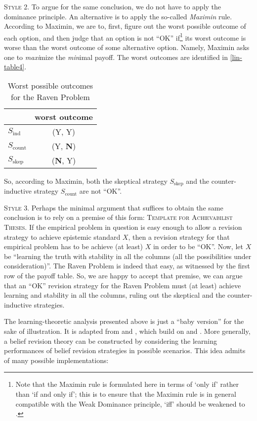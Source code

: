 \textsc{Style 2.} To argue for the same conclusion, we do not have to apply the dominance principle. An alternative is to apply the so-called {\em Maximin} rule. According to Maximin, we are to, first, figure out the worst possible outcome of each option, and then judge that an option is not ``OK'' if\footnote
	{Note that the Maximin rule is formulated here in terms of `only if' rather than `if and only if'; this is to ensure that the Maximin rule is in general compatible with the Weak Dominance principle, `iff' should be weakened to .} 
its worst outcome is worse than the worst outcome of some alternative option. Namely, Maximin asks one to {\em maxi}mize the {\em min}imal payoff. The worst outcomes are identified in \autoref{lin-table4}.
\begin{table}[ht]
\centering
\begin{tabular}{lc}
	& worst outcome
\\ \hline\hline
  	$S_{\textrm{ind}}$ & (Y, Y) \\
  	$S_{\textrm{count}}$ & (Y, \textbf{N}) \\
  	$S_{\textrm{skep}}$ & (\textbf{N}, Y)
\end{tabular}
\caption{Worst possible outcomes for the Raven Problem}\label{lin-table4}
\end{table}
So, according to Maximin, both the skeptical strategy $S_{\textrm{skep}}$ and the counter-inductive strategy $S_{\textrm{count}}$ are not ``OK''. 

\textsc{Style 3.} Perhaps the minimal argument that suffices to obtain the same conclusion is to rely on a premise of this form:
	\op 
	\xm \textsc{Template for Achievabilist Theses.} If the empirical problem in question is easy enough to allow a revision strategy to achieve epistemic standard $X$, then a revision strategy for that empirical problem has to be achieve (at least) $X$ in order to be ``OK''. 
	\ed 
Now, let $X$ be ``learning the truth with stability in all the columns (all the possibilities under consideration)''. The Raven Problem is indeed that easy, as witnessed by the first row of the payoff table. So, we are happy to accept that premise, we can argue that an ``OK'' revision strategy for the Raven Problem must (at least) achieve learning and stability in all the columns, ruling out the skeptical and the counter-inductive strategies. 


The learning-theoretic analysis presented above is just a ``baby version'' for the sake of illustration. It is adapted from \citet{genin2015theory} and \citet*{kelly2016realism}, which build on \citet{schulte1999means} and \citet{kelly2007simplicity}. More generally, a belief revision theory can be constructed by considering the learning performances of belief revision strategies in possible scenarios. This idea admits of many possible implementations: \op

